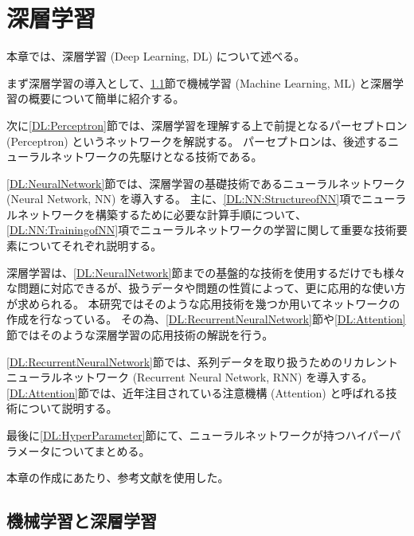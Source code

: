 
\chapter{深層学習} \label{chap:DeepLearning}

本章では、深層学習 (Deep Learning, DL) について述べる。

まず深層学習の導入として、\ref{DL:MachineandDeepLearning}節で機械学習 (Machine Learning, ML) と深層学習の概要について簡単に紹介する。

次に\ref{DL:Perceptron}節では、深層学習を理解する上で前提となるパーセプトロン (Perceptron) というネットワークを解説する。
パーセプトロンは、後述するニューラルネットワークの先駆けとなる技術である。

\ref{DL:NeuralNetwork}節では、深層学習の基礎技術であるニューラルネットワーク (Neural Network, NN) を導入する。
主に、\ref{DL:NN:StructureofNN}項でニューラルネットワークを構築するために必要な計算手順について、\ref{DL:NN:TrainingofNN}項でニューラルネットワークの学習に関して重要な技術要素についてそれぞれ説明する。

深層学習は、\ref{DL:NeuralNetwork}節までの基盤的な技術を使用するだけでも様々な問題に対応できるが、扱うデータや問題の性質によって、更に応用的な使い方が求められる。
本研究ではそのような応用技術を幾つか用いてネットワークの作成を行なっている。
その為、\ref{DL:RecurrentNeuralNetwork}節や\ref{DL:Attention}節ではそのような深層学習の応用技術の解説を行う。

\ref{DL:RecurrentNeuralNetwork}節では、系列データを取り扱うためのリカレントニューラルネットワーク (Recurrent Neural Network, RNN) を導入する。
\ref{DL:Attention}節では、近年注目されている注意機構 (Attention) と呼ばれる技術について説明する。

最後に\ref{DL:HyperParameter}節にて、ニューラルネットワークが持つハイパーパラメータについてまとめる。

本章の作成にあたり、参考文献\cite{ZeroDeepLearning1, ZeroDeepLearning2, PythonMLPrograming}を使用した。

\section{機械学習と深層学習} \label{DL:MachineandDeepLearning}

